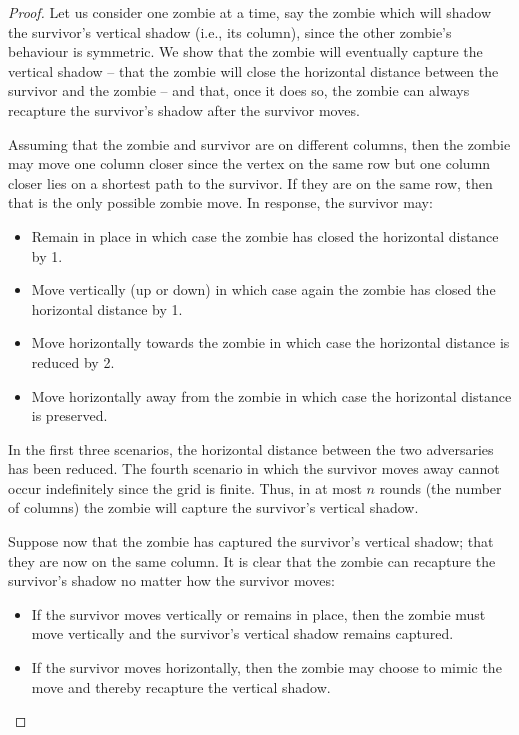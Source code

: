 \begin{proof}
Let us consider one zombie at a time, say the zombie which will shadow the
survivor's vertical shadow (i.e., its column), since the other zombie's behaviour is
symmetric. We show that the zombie will eventually
capture the vertical shadow -- that the zombie will close the horizontal distance between the
survivor and the zombie -- and that, once it does so, the zombie can always recapture the survivor's shadow
after the survivor moves.

Assuming that the zombie and survivor are on different columns, then the zombie
may move one column closer since the vertex on the same row but one column closer
 lies on a shortest path to the survivor. If they are on the same row, then that is
 the only possible zombie move. In response, the survivor may:

\begin{itemize}
  \item Remain in place in which case the zombie has closed the horizontal distance by 1.
  \item Move vertically (up or down) in which case again the zombie has closed the horizontal distance by 1.
  \item Move horizontally towards the zombie in which case the horizontal distance is reduced by 2.
  \item Move horizontally away from the zombie in which case the horizontal distance is preserved.
\end{itemize}

In the first three scenarios, the horizontal distance between the two adversaries has been reduced.
The fourth scenario in which the survivor moves away cannot occur indefinitely since the
grid is finite.  Thus, in at most $n$ rounds (the number of columns)
the zombie will capture the survivor's vertical shadow.

Suppose now that the zombie has captured the survivor's vertical shadow; that they are now
on the same column. It is
clear that the zombie can recapture the survivor's shadow no matter how the survivor moves:

\begin{itemize}
  \item If the survivor moves vertically or remains in place, then the zombie must move vertically
   and the survivor's vertical shadow remains captured.
  \item If the survivor moves horizontally, then the zombie may choose to mimic the move and thereby
  recapture the vertical shadow.
\end{itemize}


\end{proof}
